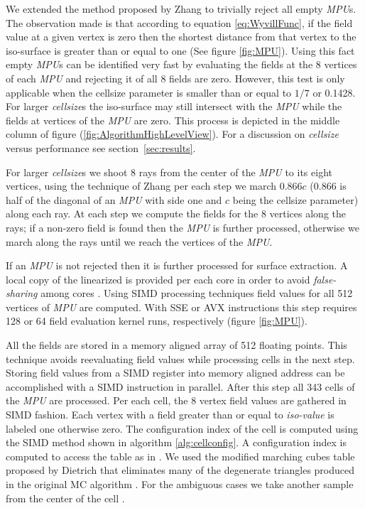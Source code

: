 We extended the method proposed by Zhang \etal \cite{Zhang2006} to trivially reject all empty \textit{MPU}s.
The observation made is that according to equation \ref{eq:WyvillFunc}, if the field value at a given vertex is zero then 
the shortest distance from that vertex to the iso-surface is greater than or equal to one (See figure \ref{fig:MPU}). Using 
this fact empty \textit{MPU}s can be identified very fast by evaluating the fields at the 8 vertices of each \textit{MPU} and rejecting it of all 8 
fields are zero. However, this test is only applicable when the cellsize parameter is smaller than or equal to $1/7$ or 0.1428. 
For larger \textit{cellsize}s the iso-surface may still intersect with the \textit{MPU} while the fields at vertices of the \textit{MPU} are zero. 
This process is depicted in the middle column of figure (\ref{fig:AlgorithmHighLevelView}).
For a discussion on \textit{cellsize} versus performance see section~\ref{sec:results}.

For larger \textit{cellsize}s we shoot 8 rays from the center of the \textit{MPU} to its eight vertices, using  the technique of Zhang \etal per 
each step we march $0.866c$ (0.866 is half of the diagonal of an \textit{MPU} with side one and $c$ being the cellsize parameter) along each ray. 
At each step we compute the fields for the 8 vertices along the rays; if a non-zero field is found then the \textit{MPU} is further processed, 
otherwise we march along the rays until we reach the vertices of the \textit{MPU}. 

If an \textit{MPU} is not rejected then it is further processed for surface extraction. A local copy of the linearized \blob is provided 
per each core in order to avoid \textit{false-sharing} among cores \cite{Bolosky1993}. Using SIMD processing techniques field values for all
512 vertices of \textit{MPU} are computed. With SSE or AVX instructions this step requires 128 or 64 field evaluation kernel runs, 
respectively (figure \ref{fig:MPU}).

All the fields are stored in a memory aligned array of 512 floating points. This technique avoids reevaluating field values while processing
cells in the next step. Storing field values from a SIMD register into memory aligned address can be accomplished with a SIMD instruction in
parallel. After this step all 343 cells of the \textit{MPU} are processed. Per each cell, the 8 vertex field values 
are gathered in SIMD fashion. Each vertex with a field greater than or equal to \textit{iso-value} is labeled one otherwise zero. 
The configuration index of the cell is computed using the SIMD method shown in algorithm \ref{alg:cellconfig}. A configuration index 
is computed to access the table as in \cite{Lorensen1987}. We used the modified marching cubes table proposed by Dietrich \etal that eliminates many 
of the degenerate triangles produced in the original MC algorithm \cite{Dietrich2009}. For the ambiguous cases we take another sample 
from the center of the cell \cite{Wyvill1986, Dietrich2009}. 

